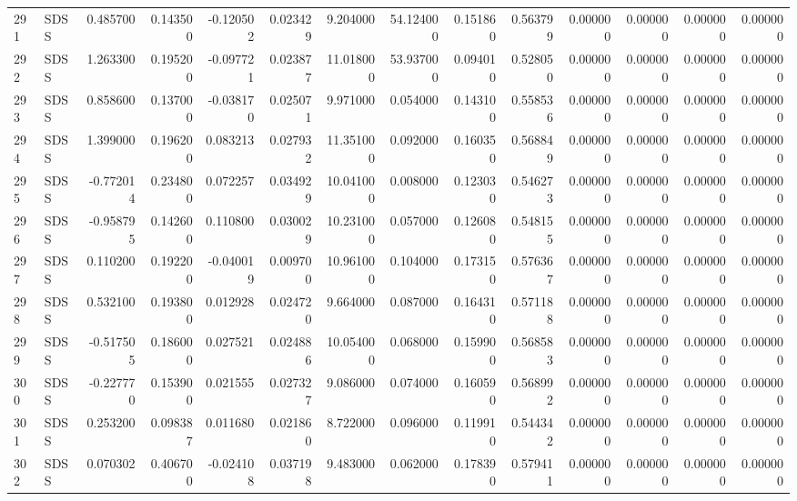 \begin{tabular}{llrrrrrrrrrrrr}
291 &   SDSS &  0.485700 &      0.143500 & -0.120502 &    0.023429 &   9.204000 &     54.124000 &   0.151860 &  0.563799 &  0.000000 &   0.000000 &     0.000000 &     0.000000 \\
292 &   SDSS &  1.263300 &      0.195200 & -0.097721 &    0.023877 &  11.018000 &     53.937000 &   0.094010 &  0.528050 &  0.000000 &   0.000000 &     0.000000 &     0.000000 \\
293 &   SDSS &  0.858600 &      0.137000 & -0.038170 &    0.025071 &   9.971000 &      0.054000 &   0.143100 &  0.558536 &  0.000000 &   0.000000 &     0.000000 &     0.000000 \\
294 &   SDSS &  1.399000 &      0.196200 &  0.083213 &    0.027932 &  11.351000 &      0.092000 &   0.160350 &  0.568849 &  0.000000 &   0.000000 &     0.000000 &     0.000000 \\
295 &   SDSS & -0.772014 &      0.234800 &  0.072257 &    0.034929 &  10.041000 &      0.008000 &   0.123030 &  0.546273 &  0.000000 &   0.000000 &     0.000000 &     0.000000 \\
296 &   SDSS & -0.958795 &      0.142600 &  0.110800 &    0.030029 &  10.231000 &      0.057000 &   0.126080 &  0.548155 &  0.000000 &   0.000000 &     0.000000 &     0.000000 \\
297 &   SDSS &  0.110200 &      0.192200 & -0.040019 &    0.009700 &  10.961000 &      0.104000 &   0.173150 &  0.576367 &  0.000000 &   0.000000 &     0.000000 &     0.000000 \\
298 &   SDSS &  0.532100 &      0.193800 &  0.012928 &    0.024720 &   9.664000 &      0.087000 &   0.164310 &  0.571188 &  0.000000 &   0.000000 &     0.000000 &     0.000000 \\
299 &   SDSS & -0.517505 &      0.186000 &  0.027521 &    0.024886 &  10.054000 &      0.068000 &   0.159900 &  0.568583 &  0.000000 &   0.000000 &     0.000000 &     0.000000 \\
300 &   SDSS & -0.227770 &      0.153900 &  0.021555 &    0.027327 &   9.086000 &      0.074000 &   0.160590 &  0.568992 &  0.000000 &   0.000000 &     0.000000 &     0.000000 \\
301 &   SDSS &  0.253200 &      0.098387 &  0.011680 &    0.021860 &   8.722000 &      0.096000 &   0.119910 &  0.544342 &  0.000000 &   0.000000 &     0.000000 &     0.000000 \\
302 &   SDSS &  0.070302 &      0.406700 & -0.024108 &    0.037198 &   9.483000 &      0.062000 &   0.178390 &  0.579411 &  0.000000 &   0.000000 &     0.000000 &     0.000000 \\

\end{tabular}
